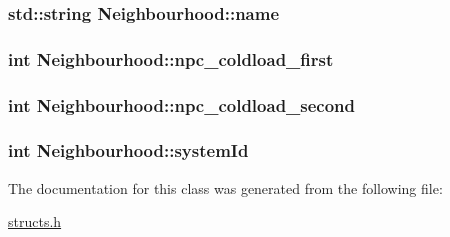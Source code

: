 \hypertarget{classNeighbourhood_a82bbd15ea0bdccee88d398070b707a04}{
\subsubsection[{name}]{\setlength{\rightskip}{0pt plus 5cm}std\-::string Neighbourhood\-::name}}\label{classNeighbourhood_a82bbd15ea0bdccee88d398070b707a04}
\hypertarget{classNeighbourhood_a7babc46bba2f997a9fd577d273bbd94f}{
\subsubsection[{npc\-\_\-coldload\-\_\-first}]{\setlength{\rightskip}{0pt plus 5cm}int Neighbourhood\-::npc\-\_\-coldload\-\_\-first}}\label{classNeighbourhood_a7babc46bba2f997a9fd577d273bbd94f}
\hypertarget{classNeighbourhood_a555736237cc2685a9aa2c16c707b8816}{
\subsubsection[{npc\-\_\-coldload\-\_\-second}]{\setlength{\rightskip}{0pt plus 5cm}int Neighbourhood\-::npc\-\_\-coldload\-\_\-second}}\label{classNeighbourhood_a555736237cc2685a9aa2c16c707b8816}
\hypertarget{classNeighbourhood_aace0c7358a67b0ba20a34cdfdc82571b}{
\subsubsection[{system\-Id}]{\setlength{\rightskip}{0pt plus 5cm}int Neighbourhood\-::system\-Id}}\label{classNeighbourhood_aace0c7358a67b0ba20a34cdfdc82571b}


The documentation for this class was generated from the following file\-:\begin{DoxyCompactItemize}
\item 
\hyperlink{structs_8h}{structs.\-h}\end{DoxyCompactItemize}
